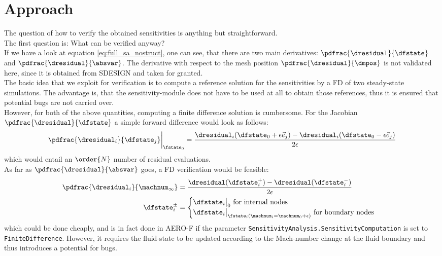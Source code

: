 \documentclass[../main.tex]{subfiles}
\begin{document}
\section{Approach}\label{sec:verification_approach}
The question of how to verify the obtained sensitivities is anything but straightforward.\\
The first question is: What can be verified anyway?\\
If we have a look at equation \eqref{eq:full_sa_nostruct}, one can see, that there are two main derivatives: $\pdfrac{\dresidual}{\dfstate}$ and $\pdfrac{\dresidual}{\absvar}$. The derivative with respect to the mesh position $\pdfrac{\dresidual}{\dmpos}$ is not validated here, since it is obtained from SDESIGN and taken for granted.\\
The basic idea that we exploit for verification is to compute a reference solution for the sensitivities by a \ac{FD} of two steady-state simulations. The advantage is, that the sensitivity-module does not have to be used at all to obtain those references, thus it is ensured that potential bugs are not carried over.\\
However, for both of the above quantities, computing a finite difference solution is cumbersome. For the Jacobian $\pdfrac{\dresidual}{\dfstate}$ a simple forward difference would look as follows:
\begin{align}
\pdfrac{\dresidual_i}{\dfstate_j}\bigg\rvert_{\fstate_0}=\frac{\dresidual_i(\dfstate_0+\epsilon\vec{e}_j)-\dresidual_i(\dfstate_0-\epsilon\vec{e}_j)}{2\epsilon}
\end{align}
which would entail an $\order{N}$ number of residual evaluations.\\
As far as $\pdfrac{\dresidual}{\absvar}$ goes, a \ac{FD} verification would be feasible:
\begin{align}
\pdfrac{\dresidual_i}{\machnum_{\infty}}&=\frac{\dresidual(\dfstate_i^{+})-\dresidual(\dfstate_i^{-})}{2\epsilon} \nonumber \\
\dfstate_i^{\pm} &=
\begin{cases}
\dfstate_i\big\rvert_{0}\text{   for internal nodes}\\
\dfstate_i\big\rvert_{\fstate_i(\machnum_i=\machnum_0+\epsilon)}\text{   for boundary nodes}
\end{cases}
\end{align}
which could be done cheaply, and is in fact done in AERO-F if the parameter \texttt{SensitivityAnalysis.SensitivityComputation} is set to \texttt{FiniteDifference}. However, it requires the fluid-state to be updated according to the Mach-number change at the fluid boundary and thus introduces a potential for bugs.\\
\end{document}
